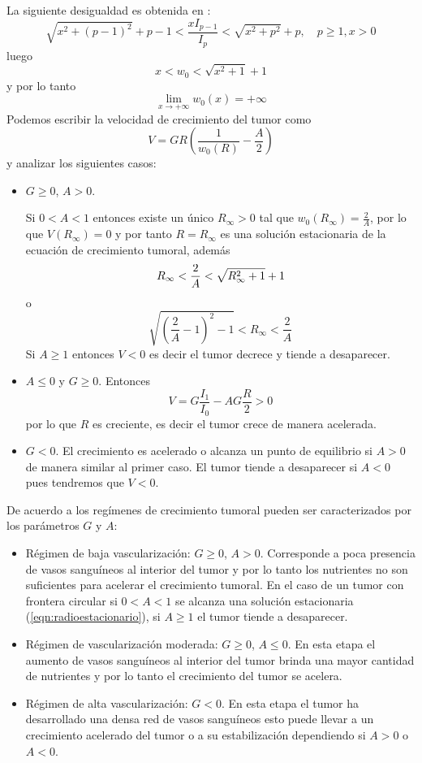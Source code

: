 La siguiente desigualdad es obtenida en \citep{yang2017sharp}:
\[
\sqrt{x^2+(p-1)^2}+p-1<\frac{xI_{p-1}}{I_p}<\sqrt{x^2+p^2}+p,\quad p\geq 1,x>0
\]
luego 
\[
x<w_0<\sqrt{x^2+1}+1
\]
y por lo tanto
\[
\lim_{x\to +\infty} w_0(x)=+\infty	
\]
Podemos escribir la velocidad de crecimiento del tumor como
\[
V= GR\left(\frac{1}{w_0(R)} -\frac{A}{2}\right)
\]
y analizar los siguientes casos:
\begin{itemize}
	\item $G\geq 0$, $A>0$. 
	
	Si $0<A<1$ entonces existe un único $R_\infty>0 $ tal que $w_0(R_\infty)=\frac{2}{A}$, por lo que  $V(R_\infty)=0$ y por tanto $R=R_\infty$ es una solución estacionaria de la ecuación de crecimiento tumoral, además
	\[
	R_\infty<\frac{2}{A}<\sqrt{	R_\infty^2+1}+1\\
	\]
	o
	\begin{equation}
		\sqrt{(\frac{2}{A}-1)^2-1}<R_{\infty}<\frac{2}{A}
		\label{eqn:radioestacionario}
	\end{equation}
	Si $A \geq 1$ entonces $V<0$ es decir el tumor decrece y tiende a desaparecer.
	\item $A\leq 0$ y $G\geq 0$. Entonces 
	\[
	V=G\frac{I_1}{I_0}-AG\frac{R}{2}>0
	\]
	por lo que $R$ es creciente, es decir el tumor crece de manera acelerada.
	\item  $G<0$. El crecimiento es acelerado o alcanza un punto de equilibrio si $A>0$ de manera similar al primer caso. El tumor tiende a desaparecer si $A<0$ pues tendremos que $V<0$.
	
\end{itemize}
De acuerdo a \cite{hogea2005computational} los regímenes de crecimiento tumoral pueden ser caracterizados por los parámetros $G$ y $A$:
\begin{itemize}
	\item Régimen de baja vascularización: $G\geq 0$, $A>0$. Corresponde a poca presencia de vasos sanguíneos al interior del tumor y por lo tanto los nutrientes no son suficientes para acelerar el crecimiento tumoral. En el caso de un tumor con frontera circular si $0<A<1$ se alcanza una solución estacionaria (\ref{eqn:radioestacionario}), si $A\geq 1$ el tumor tiende a desaparecer. 
	\item Régimen de vascularización moderada: $G\geq 0$, $A\leq 0$. En esta etapa el aumento de vasos sanguíneos al interior del tumor brinda una mayor cantidad de nutrientes y por lo tanto el crecimiento del tumor se acelera.
	\item Régimen de alta vascularización: $G<0$. En esta etapa el tumor ha desarrollado una densa red de vasos sanguíneos esto puede llevar a un crecimiento acelerado del tumor o a su estabilización dependiendo  si $A>0$ o $A<0$.
\end{itemize}

